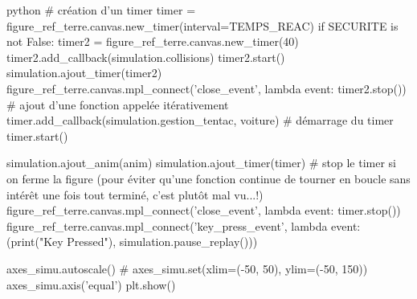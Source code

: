 \begin{mintedbox}{python}
# création d'un timer
timer = figure_ref_terre.canvas.new_timer(interval=TEMPS_REAC)
if SECURITE is not False:
    timer2 = figure_ref_terre.canvas.new_timer(40)
    timer2.add_callback(simulation.collisions)
    timer2.start()
    simulation.ajout_timer(timer2)
    figure_ref_terre.canvas.mpl_connect('close_event', lambda event: timer2.stop())
# ajout d'une fonction appelée itérativement
timer.add_callback(simulation.gestion_tentac, voiture)
# démarrage du timer
timer.start()

simulation.ajout_anim(anim)
simulation.ajout_timer(timer)
# stop le timer si on ferme la figure (pour éviter qu'une fonction continue de tourner en boucle sans intérêt une fois tout terminé, c'est plutôt mal vu...!)
figure_ref_terre.canvas.mpl_connect('close_event', lambda event: timer.stop())
figure_ref_terre.canvas.mpl_connect('key_press_event', lambda event: (print("Key Pressed"), simulation.pause_replay()))

axes_simu.autoscale()
# axes_simu.set(xlim=(-50, 50), ylim=(-50, 150))
axes_simu.axis('equal')
plt.show()

\end{mintedbox}
